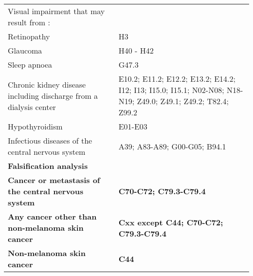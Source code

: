\begin{longtable}[t]{>{\raggedright\arraybackslash}p{17em}>{\raggedright\arraybackslash}p{17em}}
Visual impairment that may result from : & \\
Retinopathy & H3\\
\addlinespace
Glaucoma & H40 - H42\\
Sleep apnoea & G47.3\\
Chronic kidney disease including discharge from a dialysis center & E10.2; E11.2; E12.2; E13.2; E14.2; I12; I13; I15.0; I15.1; N02-N08; N18-N19; Z49.0; Z49.1; Z49.2; T82.4; Z99.2\\
Hypothyroidism & E01-E03\\
Infectious diseases of the central nervous system & A39; A83-A89; G00-G05; B94.1\\
\addlinespace
\textbf{Falsification analysis} & \textbf{}\\
\textbf{Cancer or metastasis of the central nervous system} & \textbf{C70-C72; C79.3-C79.4}\\
\textbf{Any cancer other than non-melanoma skin cancer} & \textbf{Cxx except C44; C70-C72; C79.3-C79.4}\\
\textbf{Non-melanoma skin cancer} & \textbf{C44}\\
\bottomrule
\end{longtable}
